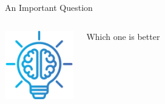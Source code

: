 \documentclass{beamer}
\begin{document}
\begin{frame}{An Important Question}
    \begin{columns}
        \includegraphics[width=3cm]{stickers/brainStorming.png}
        \begin{block}{Which one is better}
        \end{block}
    \end{columns}
\end{frame}
\end{document}
